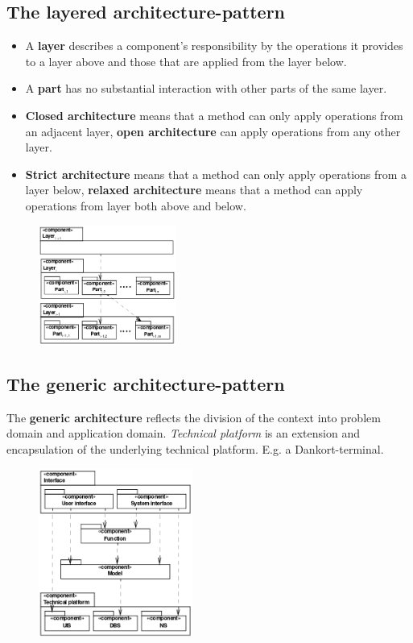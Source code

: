 \subsection{The layered architecture-pattern}
\begin{itemize}
    \item A \textbf{layer} describes a component's responsibility by the operations it provides to a layer above and those that are applied from the layer below. 
    \item A \textbf{part} has no substantial interaction with other parts of the same layer. 
    \item \textbf{Closed architecture} means that a method can only apply operations from an adjacent layer, \textbf{open architecture} can apply operations from any other layer. 
    \item\textbf{Strict architecture} means that a method can only apply operations from a layer below, \textbf{relaxed architecture} means that a method can apply operations from layer both above and below. 
\end{itemize}

\begin{figure}[H]
    \centering
    \includegraphics[width=0.4\textwidth]{figures/layeredarchitecture.png}
\end{figure}

\subsection{The generic architecture-pattern}
The \textbf{generic architecture} reflects the division of the context into problem domain and application domain. \textit{Technical platform} is an extension and encapsulation of the underlying technical platform. E.g. a Dankort-terminal.
\begin{figure}[H]
    \centering
    \includegraphics[width=0.45\textwidth]{figures/genericarchitecture.png}
\end{figure}

